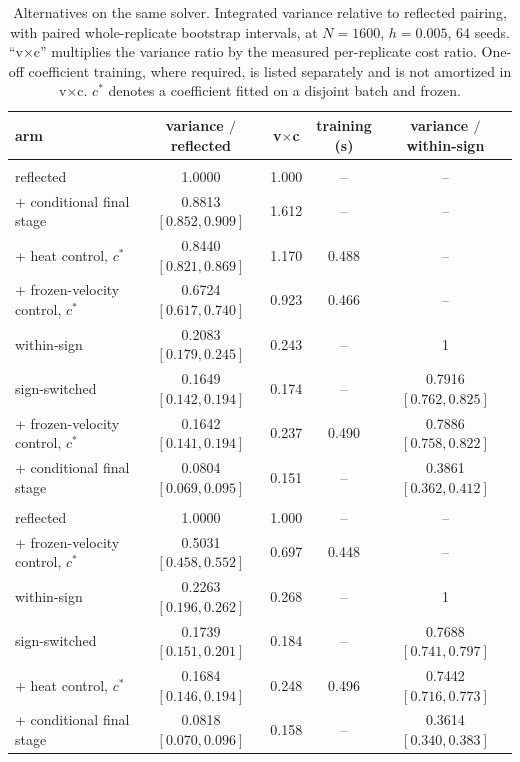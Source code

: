 \documentclass[smallextended,nospthms]{svjour3}
\theoremstyle{plain}
\theoremstyle{definition}
\theoremstyle{remark}
\numberwithin{equation}{section}
\begin{document}
\begin{table}[htbp]
\centering
\caption{Alternatives on the same solver. Integrated variance relative to
reflected pairing, with paired whole-replicate bootstrap intervals, at
$N=1600$, $h=0.005$, $64$ seeds. ``v$\times$c'' multiplies the variance ratio by
the measured per-replicate cost ratio. One-off coefficient training, where
required, is listed separately and is not amortized in v$\times$c. $c^{*}$
denotes a coefficient fitted on a disjoint batch and frozen.}
\label{tab:controls}
\small
\setlength{\tabcolsep}{3pt}
\begin{tabularx}{\linewidth}{@{}>{\raggedright\arraybackslash}Xcccc@{}}
\toprule
arm & \shortstack{variance $/$\\reflected} & v$\times$c & \shortstack{training\\(s)} & \shortstack{variance $/$\\within-sign}\\
\midrule
\multicolumn{5}{l}{Burgers flux}\\
reflected              & 1.0000 & 1.000 & -- & --\\
\;+ conditional final stage & 0.8813 $[0.852,0.909]$ & 1.612 & -- & --\\
\;+ heat control, $c^{*}$   & 0.8440 $[0.821,0.869]$ & 1.170 & 0.488 & --\\
\;+ frozen-velocity control, $c^{*}$ & 0.6724 $[0.617,0.740]$ & 0.923 & 0.466 & --\\
within-sign            & 0.2083 $[0.179,0.245]$ & 0.243 & -- & 1\\
sign-switched & 0.1649 $[0.142,0.194]$ & 0.174 & -- & 0.7916 $[0.762,0.825]$\\
\;+ frozen-velocity control, $c^{*}$ & 0.1642 $[0.141,0.194]$ & 0.237 & 0.490 & 0.7886 $[0.758,0.822]$\\
\;+ conditional final stage & 0.0804 $[0.069,0.095]$ & 0.151 & -- & 0.3861 $[0.362,0.412]$\\
\midrule
\multicolumn{5}{l}{Cubic flux}\\
reflected              & 1.0000 & 1.000 & -- & --\\
\;+ frozen-velocity control, $c^{*}$ & 0.5031 $[0.458,0.552]$ & 0.697 & 0.448 & --\\
within-sign            & 0.2263 $[0.196,0.262]$ & 0.268 & -- & 1\\
sign-switched & 0.1739 $[0.151,0.201]$ & 0.184 & -- & 0.7688 $[0.741,0.797]$\\
\;+ heat control, $c^{*}$ & 0.1684 $[0.146,0.194]$ & 0.248 & 0.496 & 0.7442 $[0.716,0.773]$\\
\;+ conditional final stage & 0.0818 $[0.070,0.096]$ & 0.158 & -- & 0.3614 $[0.340,0.383]$\\
\bottomrule
\end{tabularx}
\end{table}
\end{document}
